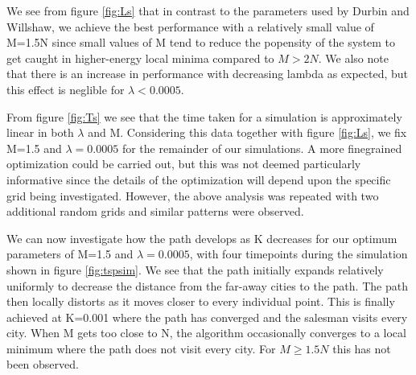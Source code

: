 \documentclass{article}
\begin{document}
We see from figure \ref{fig:Ls} that in contrast to the parameters used by Durbin and Willshaw, we achieve the best performance with a relatively small value of M=1.5N since small values of M tend to reduce the popensity of the system to get caught in higher-energy local minima compared to $M > 2N$. We also note that there is an increase in performance with decreasing lambda as expected, but this effect is neglible for $\lambda < 0.0005$.

From figure \ref{fig:Ts} we see that the time taken for a simulation is approximately linear in both $\lambda$ and M. Considering this data together with figure \ref{fig:Ls}, we fix M=1.5 and $\lambda = 0.0005$ for the remainder of our simulations. A more finegrained optimization could be carried out, but this was not deemed particularly informative since the details of the optimization will depend upon the specific grid being investigated. However, the above analysis was repeated with two additional random grids and similar patterns were observed.

We can now investigate how the path develops as K decreases for our optimum parameters of M=1.5 and $\lambda = 0.0005$, with four timepoints during the simulation shown in figure \ref{fig:tspsim}. We see that the path initially expands relatively uniformly to decrease the distance from the far-away cities to the path. The path then locally distorts as it moves closer to every individual point. This is finally achieved at K=0.001 where the path has converged and the salesman visits every city. When M gets too close to N, the algorithm occasionally converges to a local minimum where the path does not visit every city. For $M \geq 1.5N$ this has not been observed.
\end{document}
